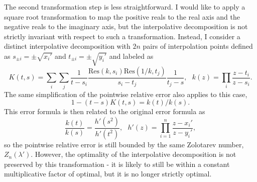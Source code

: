 \documentclass[12pt]{article}
\begin{document}
The second transformation step is less straightforward.
I would like to apply a square root transformation to map the positive reals to the real axis and the negative reals to the imaginary axis,
 but the interpolative decomposition is not strictly invariant with respect to such a transformation.
Instead, I consider a distinct interpolative decomposition with $2n$ pairs of interpolation points defined as $s_{\pm i} = \pm \sqrt{x_i'}$ and $t_{\pm i} = \pm \sqrt{y_i'}$
 and labeled as
\begin{equation} \label{interpolation2}
 K(t,s) = \sum_{i} \sum_{j} \frac{1}{t-s_i} \frac{\mathrm{Res}(k, s_i) \mathrm{Res}(1/k,t_j)}{s_i - t_j} \frac{1}{t_j - s}, \ \ \ k(z) = \prod_i \frac{z-t_i}{z-s_i}.
\end{equation}
The same simplification of the pointwise relative error also applies to this case,
\begin{equation}
 1 - (t-s) K(t,s) = k(t)/k(s).
\end{equation}
This error formula is then related to the original error formula as
\begin{equation}
 \frac{k(t)}{k(s)} = \frac{h'(s^2)}{h'(t^2)}, \ \ \ h'(z) = \prod_{i=1}^n \frac{z-x_i'}{z - y_i'},
\end{equation}
 so the pointwise relative error is still bounded by the same Zolotarev number, $Z_n(\lambda')$.
However, the optimality of the interpolative decomposition is not preserved by this transformation - it is likely to still be within a constant multiplicative factor of optimal, but it is no longer strictly optimal.
\end{document}
